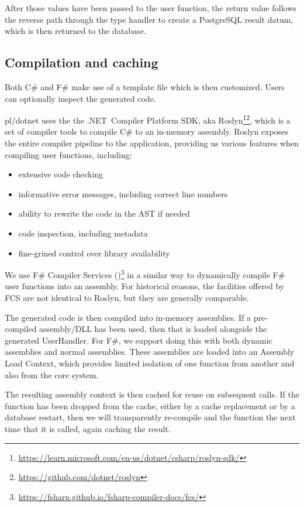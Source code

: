 \documentclass[sigconf,techreport,authorversion,nonacm]{acmart}
\newcommand{\dotnet}{.NET}
\begin{document}
After those values have been passed to the user function, the return
value follows the reverse path through the type handler to create
a PostgreSQL result datum, which is then returned to the database.

\subsection{Compilation and caching}

Both C\# and F\# make use of a template file which is then customized.
Users can optionally inspect the generated code.

pl/dotnet uses the the \dotnet\ Compiler Platform SDK, aka Roslyn\footnote{\url{https://learn.microsoft.com/en-us/dotnet/csharp/roslyn-sdk/}}\footnote{\url{https://github.com/dotnet/roslyn}},
which is a set of compiler tools to compile C\# to an in-memory
assembly. Roslyn exposes the entire compiler pipeline to the
application, providing us various features when compiling
user functions, including:

\begin{itemize}[itemsep=0pt]
    \item extensive code checking
    \item informative error messages, including correct line numbers
    \item ability to rewrite the code in the AST if needed
    \item code inspection, including metadata
    \item fine-grined control over library availability
\end{itemize}

We use F\# Compiler Services ()\footnote{\url{https://fsharp.github.io/fsharp-compiler-docs/fcs/}}
in a similar way to dynamically compile F\# user functions into an
assembly. For historical reasons, the facilities offered by FCS
are not identical to Roslyn, but they are generally comparable.

The generated code is then compiled into in-memory assemblies. If
a pre-compiled assembly/DLL has been used, then that is loaded
alongside the generated UserHandler. For F\#, we support doing this
with both dynamic assemblies and normal assemblies. These assemblies
are loaded into an Assembly Load Context, which provides limited
isolation of one function from another and also from the core system.

The resulting assembly context is then cached for reuse on subsequent
calls. If the function has been dropped from the cache, either by
a cache replacement or by a database restart, then we will transparently
re-compile and the function the next time that it is called, again
caching the result.
\end{document}
